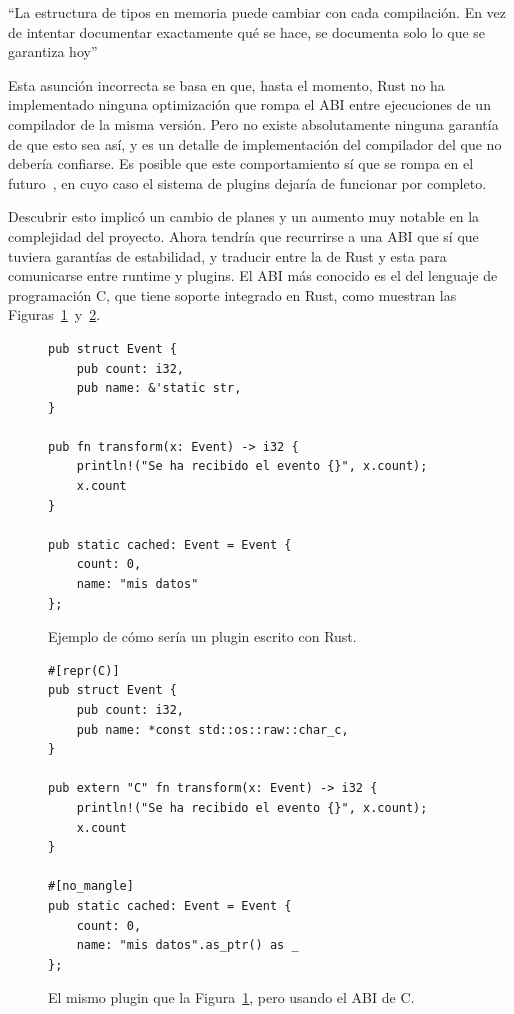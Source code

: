 ``La estructura de tipos en memoria puede cambiar con cada compilación. En vez
de intentar documentar exactamente qué se hace, se documenta solo lo que se
garantiza hoy''~\cite[Type Layout]{rustref}

Esta asunción incorrecta se basa en que, hasta el momento, Rust no ha
implementado ninguna optimización que rompa el ABI entre ejecuciones de un
compilador de la misma versión. Pero no existe absolutamente ninguna garantía de
que esto sea así, y es un detalle de implementación del compilador del que no
debería confiarse. Es posible que este comportamiento sí que se rompa en el
futuro~\cite{randomizelayout}, en cuyo caso el sistema de plugins dejaría de
funcionar por completo.

Descubrir esto implicó un cambio de planes y un aumento muy notable en la
complejidad del proyecto. Ahora tendría que recurrirse a una ABI que sí que
tuviera garantías de estabilidad, y traducir entre la de Rust y esta para
comunicarse entre runtime y plugins. El ABI más conocido es el del lenguaje de
programación C, que tiene soporte integrado en Rust, como muestran las
Figuras~\ref{fig:rustpure}~y~\ref{fig:rustffi}.

\begin{figure}
    \centering
    \begin{verbatim}
pub struct Event {
    pub count: i32,
    pub name: &'static str,
}

pub fn transform(x: Event) -> i32 {
    println!("Se ha recibido el evento {}", x.count);
    x.count
}

pub static cached: Event = Event {
    count: 0,
    name: "mis datos"
};
    \end{verbatim}

    \caption{Ejemplo de cómo sería un plugin escrito con Rust.}%
    \label{fig:rustpure}
\end{figure}

\begin{figure}
    \centering
    \begin{verbatim}
#[repr(C)]
pub struct Event {
    pub count: i32,
    pub name: *const std::os::raw::char_c,
}

pub extern "C" fn transform(x: Event) -> i32 {
    println!("Se ha recibido el evento {}", x.count);
    x.count
}

#[no_mangle]
pub static cached: Event = Event {
    count: 0,
    name: "mis datos".as_ptr() as _
};
    \end{verbatim}

    \caption{El mismo plugin que la Figura~\ref{fig:rustpure}, pero usando el
    ABI de C.}%
    \label{fig:rustffi}
\end{figure}

